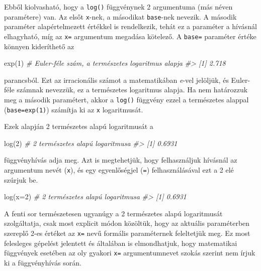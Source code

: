 \documentclass[
]{book}
\newenvironment{Shaded}{\begin{snugshade}}{\end{snugshade}}
\newcommand{\AttributeTok}[1]{\textcolor[rgb]{0.77,0.63,0.00}{#1}}
\newcommand{\CommentTok}[1]{\textcolor[rgb]{0.56,0.35,0.01}{\textit{#1}}}
\newcommand{\DecValTok}[1]{\textcolor[rgb]{0.00,0.00,0.81}{#1}}
\newcommand{\FunctionTok}[1]{\textcolor[rgb]{0.00,0.00,0.00}{#1}}
\newcommand{\NormalTok}[1]{#1}
\begin{document}
Ebből kiolvasható, hogy a \texttt{log()} függvénynek 2 argumentuma (más néven paramétere) van. Az elsőt \texttt{x}-nek, a másodikat \texttt{base}-nek nevezik. A második paraméter alapértelmezett értékkel is rendelkezik, tehát ez a paraméter a hívásnál elhagyható, míg az \texttt{x=} argumentum megadása kötelező. A \texttt{base=} paraméter értéke könnyen kideríthető az

\begin{Shaded}
\begin{Highlighting}[]
\FunctionTok{exp}\NormalTok{(}\DecValTok{1}\NormalTok{)    }\CommentTok{\#  Euler{-}féle szám, a természetes logaritmus alapja }
\CommentTok{\#\textgreater{} [1] 2.718}
\end{Highlighting}
\end{Shaded}

parancsból. Ezt az irracionális számot a matematikában \emph{e}-vel jelöljük, és Euler-féle számnak nevezzük, ez a természetes logaritmus alapja. Ha nem határozzuk meg a második paramétert, akkor a \texttt{log()} függvény ezzel a természetes alappal (\texttt{base=exp(1)}) számítja ki az \texttt{x} logaritmusát.

Ezek alapján 2 természetes alapú logaritmusát a

\begin{Shaded}
\begin{Highlighting}[]
\FunctionTok{log}\NormalTok{(}\DecValTok{2}\NormalTok{)    }\CommentTok{\# 2 természetes alapú logaritmusa}
\CommentTok{\#\textgreater{} [1] 0.6931}
\end{Highlighting}
\end{Shaded}

függvényhívás adja meg. Azt is megtehetjük, hogy felhasználjuk hívásnál az argumentum nevét (\texttt{x}), és egy egyenlőségjel (\texttt{=}) felhasználásával ezt a 2 elé szúrjuk be.

\begin{Shaded}
\begin{Highlighting}[]
\FunctionTok{log}\NormalTok{(}\AttributeTok{x=}\DecValTok{2}\NormalTok{)   }\CommentTok{\# 2 természetes alapú logaritmusa}
\CommentTok{\#\textgreater{} [1] 0.6931}
\end{Highlighting}
\end{Shaded}

A fenti sor természetesen ugyanúgy a 2 természetes alapú logaritmusát szolgáltatja, csak most explicit módon közöltük, hogy az aktuális paraméterben szereplő 2-es értéket az \texttt{x=} nevű formális paraméternek feleltetjük meg. Ez most felesleges gépelést jelentett és általában is elmondhatjuk, hogy matematikai függvények esetében az oly gyakori \texttt{x=} argumentumnevet szokás szerint nem írjuk ki a függvényhívás során.
\end{document}
